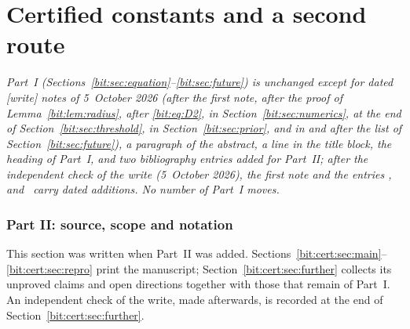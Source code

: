 \documentclass[11pt]{article}
\theoremstyle{definition}\newtheorem{definition}[theorem]{Definition}
\theoremstyle{remark}\newtheorem{remark}[theorem]{Remark}
\begin{document}
\clearpage
\part{Certified constants and a second route}\label{bit:cert:part}

\noindent\emph{Part~I (Sections~\ref{bit:sec:equation}--\ref{bit:sec:future})
is unchanged except for dated \textsf{[write]} notes of 5~October 2026 (after
the first note, after the proof of Lemma~\ref{bit:lem:radius}, after
\eqref{bit:eq:D2}, in Section~\ref{bit:sec:numerics}, at the end of
Section~\ref{bit:sec:threshold}, in Section~\ref{bit:sec:prior}, and in and
after the list of Section~\ref{bit:sec:future}), a paragraph of the abstract,
a line in the title block, the heading of Part~I, and two bibliography
entries added for Part~II; after the independent check of the write
(5~October 2026), the first note and the entries \cite{mmm}, \cite{oeis3}
and~\cite{oeis4} carry dated additions. No number of Part~I moves.}

\section{Part II: source, scope and notation}\label{bit:cert:sec:intro}
This section was written when Part~II was added.
Sections~\ref{bit:cert:sec:main}--\ref{bit:cert:sec:repro} print the
manuscript; Section~\ref{bit:cert:sec:further} collects its unproved claims
and open directions together with those that remain of Part~I. An independent
check of the write, made afterwards, is recorded at the end of
Section~\ref{bit:cert:sec:further}.
\end{document}
